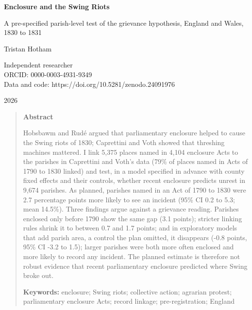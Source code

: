 \documentclass[11pt,a4paper]{article}
\begin{document}
\begin{center}
{\LARGE\bfseries Enclosure and the Swing Riots\par}
\vspace{0.4em}
{\large A pre-specified parish-level test of the grievance hypothesis, England and Wales, 1830 to 1831\par}
\vspace{1.2em}
{\large Tristan Hotham\par}
\vspace{0.3em}
{\small Independent researcher\\ ORCID: 0000-0003-4931-9349\\ Data and code: https://doi.org/10.5281/zenodo.24091976\par}
\vspace{0.8em}
2026
\end{center}

\begin{quote}\small
\begin{center}\textbf{Abstract}\end{center}
Hobsbawm and Rud\'e argued that parliamentary enclosure helped to cause the Swing riots of 1830; Caprettini and Voth showed that threshing machines mattered. I link 5,375 places named in 4,104 enclosure Acts to the parishes in Caprettini and Voth's data (79\% of places named in Acts of 1790 to 1830 linked) and test, in a model specified in advance with county fixed effects and their controls, whether recent enclosure predicts unrest in 9,674 parishes. As planned, parishes named in an Act of 1790 to 1830 were 2.7 percentage points more likely to see an incident (95\% CI 0.2 to 5.3; mean 14.5\%). Three findings argue against a grievance reading. Parishes enclosed only before 1790 show the same gap (3.1 points); stricter linking rules shrink it to between 0.7 and 1.7 points; and in exploratory models that add parish area, a control the plan omitted, it disappears (-0.8 points, 95\% CI -3.2 to 1.5); larger parishes were both more often enclosed and more likely to record any incident. The planned estimate is therefore not robust evidence that recent parliamentary enclosure predicted where Swing broke out.

\textbf{Keywords:} enclosure; Swing riots; collective action; agrarian protest; parliamentary enclosure Acts; record linkage; pre-registration; England
\end{quote}
\end{document}

